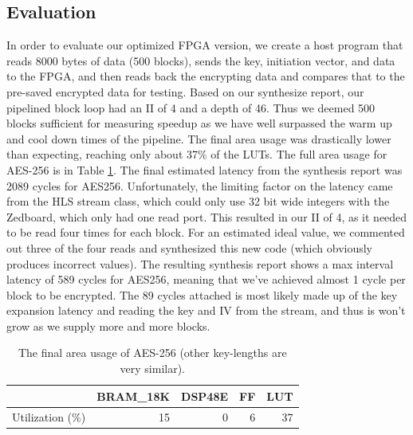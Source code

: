 \subsection{Evaluation}
In order to evaluate our optimized FPGA version, we create a host program that reads 8000 bytes of data (500 blocks), sends the key, initiation vector, and data to the FPGA, and then reads back the encrypting data and compares that to the pre-saved encrypted data for testing. Based on our synthesize report, our pipelined block loop had an II of 4 and a depth of 46. Thus we deemed 500 blocks sufficient for measuring speedup as we have well surpassed the warm up and cool down times of the pipeline. The final area usage was drastically lower than expecting, reaching only about 37\% of the LUTs. The full area usage for AES-256 is in Table \ref{table:aesarea}. The final estimated latency from the synthesis report was 2089 cycles for AES256. Unfortunately, the limiting factor on the latency came from the HLS stream class, which could only use 32 bit wide integers with the Zedboard, which only had one read port. This resulted in our II of 4, as it needed to be read four times for each block. For an estimated ideal value, we commented out three of the four reads and synthesized this new code (which obviously produces incorrect values). The resulting synthesis report shows a max interval latency of 589 cycles for AES256, meaning that we've achieved almost 1 cycle per block to be encrypted. The 89 cycles attached is most likely made up of the key expansion latency and reading the key and IV from the stream, and thus is won't grow as we supply more and more blocks. 

\begin{table}[h]
\begin{center}
\begin{tabular}{@{}r r r r r@{}}
\toprule
& BRAM\_18K &  DSP48E &   FF    &  LUT \\ \midrule
Utilization (\%)  &       15 &      0 &       6 &     37 \\ \bottomrule
\end{tabular}
\label{table:aesarea}
\caption{The final area usage of AES-256 (other key-lengths are very similar).}
\end{center}
\end{table}

